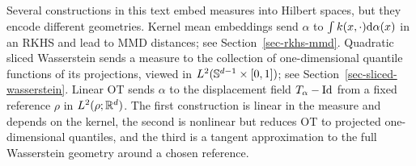 \begin{rem}\label{rem-three-hilbertian-measure-embeddings}
	Several constructions in this text embed measures into Hilbert spaces, but they encode different geometries. Kernel mean embeddings send $\alpha$ to $\int k(x,\cdot)\mathrm{d}\alpha(x)$ in an RKHS and lead to MMD distances; see Section~\ref{sec-rkhs-mmd}. Quadratic sliced Wasserstein sends a measure to the collection of one-dimensional quantile functions of its projections, viewed in $L^2(\mathbb{S}^{d-1}\times[0,1])$; see Section~\ref{sec-sliced-wasserstein}. Linear OT sends $\alpha$ to the displacement field $T_\alpha-\mathrm{Id}$ from a fixed reference $\rho$ in $L^2(\rho;\mathbb{R}^d)$. The first construction is linear in the measure and depends on the kernel, the second is nonlinear but reduces OT to projected one-dimensional quantiles, and the third is a tangent approximation to the full Wasserstein geometry around a chosen reference.
\end{rem}

